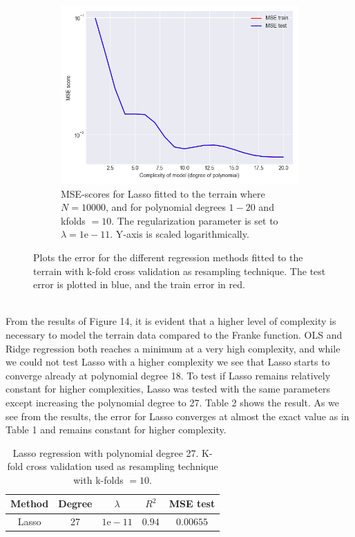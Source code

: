 \documentclass[a4paper,twocolumn]{article}
\begin{document}
\begin{figure}[H]
    \begin{subfigure}[b]{0.9\columnwidth}
        \includegraphics[width=\columnwidth]{mse_vs_complexity_Lasso_N=10000_Noise=0.0_Degree=1-20.png}
        \caption{MSE-scores for Lasso fitted to the terrain where $N = 10000$, and for polynomial degrees $1- 20$ and kfolds $= 10$. The regularization parameter is set to $\lambda = 1\textrm{e}-11$. Y-axis is scaled logarithmically.}
    \end{subfigure}
    \caption{Plots the error for the different regression methods fitted to the terrain with k-fold cross validation as resampling technique. The test error is plotted in blue, and the train error in red.}
\end{figure}\\
\noindent From the results of Figure 14, it is evident that a higher level of complexity is necessary to model the terrain data compared to the Franke function. OLS and Ridge regression both reaches a minimum at a very high complexity, and while we could not test Lasso with a higher complexity we see that Lasso starts to converge already at polynomial degree 18. To test if Lasso remains relatively constant for higher complexities, Lasso was tested with the same parameters except increasing the polynomial degree to 27. Table 2 shows the result. As we see from the results, the error for Lasso converges at almost the exact value as in Table 1 and remains constant for higher complexity.
\begin{table}[h]
    \centering
    \caption{Lasso regression with polynomial degree 27. K-fold cross validation used as resampling technique with k-folds $= 10$.}
    \begin{tabular}{|c||c|c|c|c| }
    \hline
        Method & Degree & $\lambda$ & $R^{2}$ & MSE test \\ 
        \hline\hline
        Lasso & 27 & $1\textrm{e}-11$ & $0.94$ & $0.00655$\\
        \hline
    \end{tabular}
\end{table}\\
\end{document}
